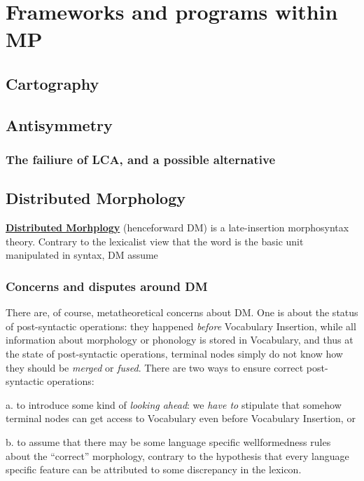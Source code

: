 \documentclass[a4paper]{article}
\newcommand*{\concept}[1]{\underline{\textbf{#1}}}
\begin{document}
\section{Frameworks and programs within MP}\label{sec:framework}

\subsection{Cartography}

\subsection{Antisymmetry}

\subsubsection{The failiure of LCA, and a possible alternative}

\subsection{Distributed Morphology}

\concept{Distributed Morhplogy} (henceforward DM) is a late-insertion morphosyntax theory.
Contrary to the lexicalist view that the word is the basic unit manipulated in syntax, DM assume

\subsubsection{Concerns and disputes around DM}

There are, of course, metatheoretical concerns about DM.
One is about the status of post-syntactic operations: they happened \emph{before} Vocabulary Insertion, while all information about morphology or phonology is stored in Vocabulary, and thus at the state of post-syntactic operations, terminal nodes simply do not know how they should be \emph{merged} or \emph{fused}.
There are two ways to ensure correct post-syntactic operations: 
\begin{inparaitem}
    \item[a.] to introduce some kind of \emph{looking ahead}: we \emph{have to} stipulate that somehow terminal nodes can get access to Vocabulary even before Vocabulary Insertion, or 
    \item[b.] to assume that there may be some language specific wellformedness rules about the ``correct'' morphology, contrary to the hypothesis that every language specific feature can be attributed to some discrepancy in the lexicon.
\end{inparaitem}
\end{document}
